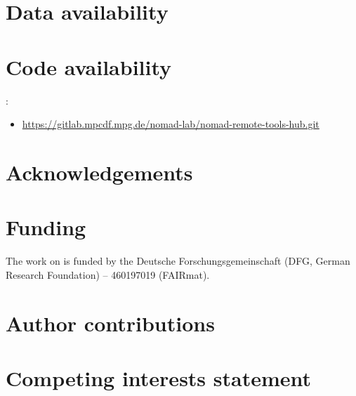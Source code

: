 \section*{Data availability}

\section*{Code availability}
:
\sloppy
\begin{itemize}
    \item \href{https://gitlab.mpcdf.mpg.de/nomad-lab/nomad-remote-tools-hub.git}{https://gitlab.mpcdf.mpg.de/nomad-lab/nomad-remote-tools-hub.git}
\end{itemize}
\fussy

\section*{Acknowledgements}

\section*{Funding}
The work on  is funded by the Deutsche Forschungsgemeinschaft (DFG, German Research Foundation) – 460197019 (FAIRmat).

\section*{Author contributions}

\section*{Competing interests statement}
